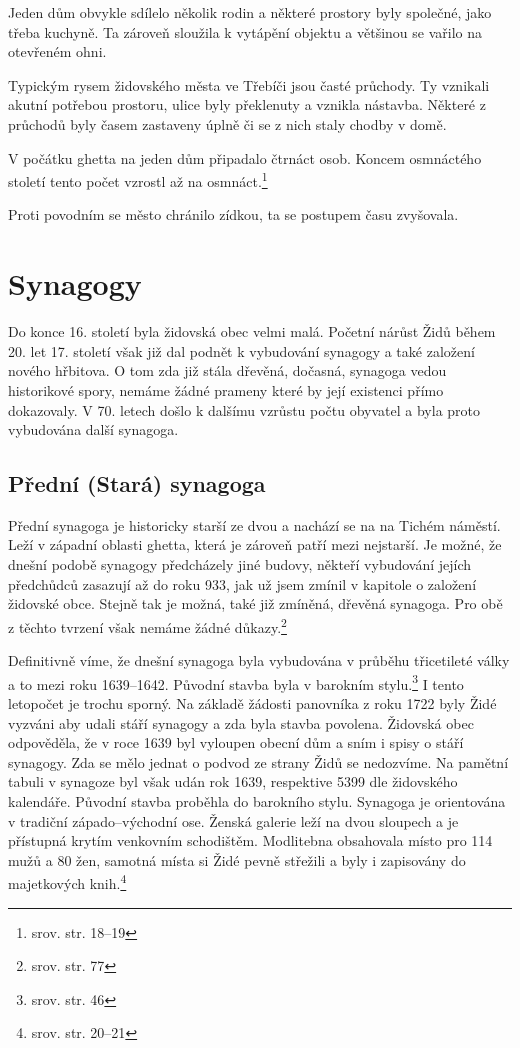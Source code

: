\documentclass[a4paper,oneside,12pt]{report}
\begin{document}
Jeden dům obvykle sdílelo několik rodin a některé prostory byly společné, jako třeba kuchyně.
Ta zároveň sloužila k vytápění objektu a většinou se vařilo na otevřeném ohni.

Typickým rysem židovského města ve Třebíči jsou časté průchody.
Ty vznikali akutní potřebou prostoru, ulice byly překlenuty a vznikla nástavba.
Některé z průchodů byly časem zastaveny úplně či se z nich staly chodby v domě.

V počátku ghetta na jeden dům připadalo čtrnáct osob.
Koncem osmnáctého století tento počet vzrostl až na osmnáct.\footnote{srov.  str. 18--19}

Proti povodním se město chránilo zídkou, ta se postupem času zvyšovala.

\section{Synagogy}

Do konce 16. století byla židovská obec velmi malá.
Početní nárůst Židů během 20. let 17. století však již dal podnět k vybudování synagogy a také založení nového hřbitova.
O tom zda již stála dřevěná, dočasná, synagoga vedou historikové spory, nemáme žádné prameny které by její existenci přímo dokazovaly.
V 70. letech došlo k dalšímu vzrůstu počtu obyvatel a byla proto vybudována další synagoga.

\subsection{Přední (Stará) synagoga}

Přední synagoga je historicky starší ze dvou a nachází se na na Tichém náměstí.
Leží v západní oblasti ghetta, která je zároveň patří mezi nejstarší.
Je možné, že dnešní podobě synagogy předcházely jiné budovy, někteří vybudování jejích předchůdců zasazují až do roku 933, jak už jsem zmínil v kapitole o založení židovské obce.
Stejně tak je možná, také již zmíněná, dřevěná synagoga.
Pro obě z těchto tvrzení však nemáme žádné důkazy.\footnote{srov. \cite{Fiser2005} str. 77}

Definitivně víme, že dnešní synagoga byla vybudována v průběhu třicetileté války a to mezi roku 1639--1642.
Původní stavba byla v barokním stylu.\footnote{srov. \cite{Klenovsky2003} str. 46}
I tento letopočet je trochu sporný.
Na základě žádosti panovníka z roku 1722 byly Židé vyzváni aby udali stáří synagogy a zda byla stavba povolena.
Židovská obec odpověděla, že v roce 1639 byl vyloupen obecní dům a sním i spisy o stáří synagogy.
Zda se mělo jednat o podvod ze strany Židů se nedozvíme.
Na pamětní tabuli v synagoze byl však udán rok 1639, respektive 5399 dle židovského kalendáře.
Původní stavba proběhla do barokního stylu.
Synagoga je orientována v tradiční západo--východní ose.
Ženská galerie leží na dvou sloupech a je přístupná krytím venkovním schodištěm.
Modlitebna obsahovala místo pro 114 mužů a 80 žen, samotná místa si Židé pevně střežili a byly i zapisovány do majetkových knih.\footnote{srov. \cite{Hanackova2008} str. 20--21}
\end{document}
